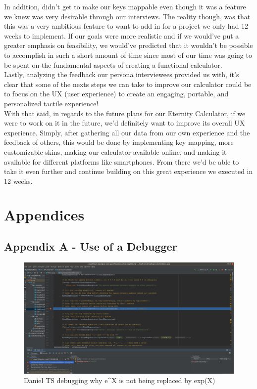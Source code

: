 \documentclass[a4paper, 12pt]{article}
\begin{document}
In addition, didn’t get to make our keys mappable even though it was a feature we knew was very desirable through our interviews. The reality though, was that this was a very ambitious feature to want to add in for a project we only had 12 weeks to implement. If our goals were more realistic and if we would’ve put a greater emphasis on feasibility, we would’ve predicted that it wouldn’t be possible to accomplish in such a short amount of time since most of our time was going to be spent on the fundamental aspects of creating a functional calculator. 
\\

Lastly, analyzing the feedback our persona interviewees provided us with, it’s clear that some of the nexts steps we can take to improve our calculator could be to focus on the UX (user experience) to create an engaging, portable, and personalized tactile experience! 
\\

With that said, in regards to the future plans for our Eternity Calculator, if we were to work on it in the future, we’d definitely want to improve its overall UX experience. Simply, after gathering all our data from our own experience and the feedback of others, this would be done by implementing key mapping, more customizable skins, making our calculator available online, and making it available for different platforms like smartphones. From there we’d be able to take it even further and continue building on this great experience we executed in 12 weeks.

\pagebreak

\section{Appendices}

\subsection{Appendix A - Use of a Debugger}

\begin{figure}[H]
\centering
\includegraphics[width=1.13\textwidth]{dan1.png}
\caption{Daniel TS debugging why e\textasciicircum X is not being replaced by exp(X)}
\label{Dan1}
\end{figure}
\end{document}
